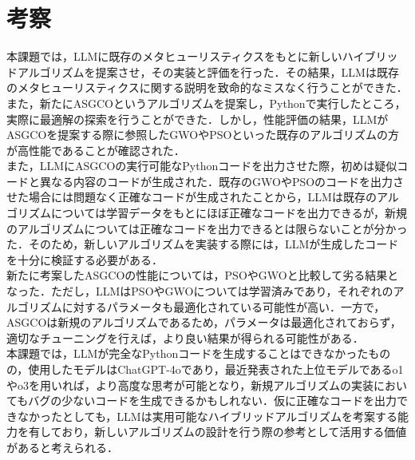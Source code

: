 \documentclass[a4paper]{ltjsarticle}
\begin{document}
\section{考察}
本課題では，LLMに既存のメタヒューリスティクスをもとに新しいハイブリッドアルゴリズムを提案させ，その実装と評価を行った．その結果，LLMは既存のメタヒューリスティクスに関する説明を致命的なミスなく行うことができた．また，新たにASGCOというアルゴリズムを提案し，Pythonで実行したところ，実際に最適解の探索を行うことができた．しかし，性能評価の結果，LLMがASGCOを提案する際に参照したGWOやPSOといった既存のアルゴリズムの方が高性能であることが確認された．\\\quad
また，LLMにASGCOの実行可能なPythonコードを出力させた際，初めは疑似コードと異なる内容のコードが生成された．既存のGWOやPSOのコードを出力させた場合には問題なく正確なコードが生成されたことから，LLMは既存のアルゴリズムについては学習データをもとにほぼ正確なコードを出力できるが，新規のアルゴリズムについては正確なコードを出力できるとは限らないことが分かった．そのため，新しいアルゴリズムを実装する際には，LLMが生成したコードを十分に検証する必要がある．\\\quad
新たに考案したASGCOの性能については，PSOやGWOと比較して劣る結果となった．ただし，LLMはPSOやGWOについては学習済みであり，それぞれのアルゴリズムに対するパラメータも最適化されている可能性が高い．一方で，ASGCOは新規のアルゴリズムであるため，パラメータは最適化されておらず，適切なチューニングを行えば，より良い結果が得られる可能性がある．\\\quad
本課題では，LLMが完全なPythonコードを生成することはできなかったものの，使用したモデルはChatGPT-4oであり，最近発表された上位モデルであるo1やo3を用いれば，より高度な思考が可能となり，新規アルゴリズムの実装においてもバグの少ないコードを生成できるかもしれない．仮に正確なコードを出力できなかったとしても，LLMは実用可能なハイブリッドアルゴリズムを考案する能力を有しており，新しいアルゴリズムの設計を行う際の参考として活用する価値があると考えられる．
\end{document}
